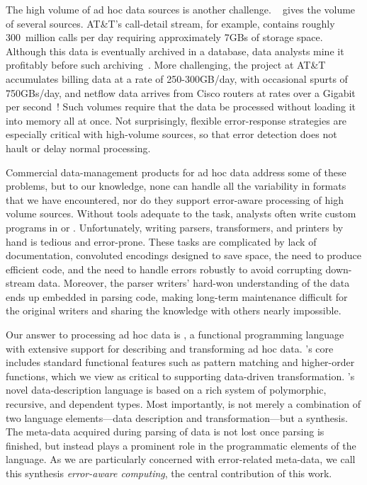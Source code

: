 The high volume of ad hoc data sources is another challenge.
~ gives the volume of several sources.
AT\&T's call-detail stream, for example, contains roughly 300~million
calls per day requiring approximately 7GBs of storage space.  Although
this data is eventually archived in a database, data analysts mine it
profitably before such archiving~\cite{kdd98,kdd99}.  More
challenging, the \ningaui{} project at AT\&T accumulates billing data
at a rate of 250-300GB/day, with occasional spurts of 750GBs/day, and
netflow data arrives from Cisco routers at rates over a Gigabit per
second~\cite{gigascope}!  Such volumes require that the data be
processed without loading it into memory all at once.  Not
surprisingly, flexible error-response strategies are especially
critical with high-volume sources, so that error detection does not
hault or delay normal processing.


Commercial data-management products for ad hoc data address 
some of these problems, but to our knowledge, none can handle all the variability
in formats that we have encountered, nor do they support error-aware
processing of high volume sources.  Without tools adequate to the
task, analysts often write custom programs in \C{} or \perl{}.
Unfortunately, writing parsers, transformers, and printers by hand is
tedious and error-prone.  These tasks are complicated by lack of
documentation, convoluted encodings designed to save space, the need
to produce efficient code, and the need to handle errors robustly to
avoid corrupting down-stream data.  Moreover, the parser writers'
hard-won understanding of the data ends up embedded in parsing code,
making long-term maintenance difficult for the original writers and
sharing the knowledge with others nearly impossible.


Our answer to processing ad hoc data is \datatype{}, a functional
programming language with extensive support for describing and
transforming ad hoc data.  \datatype{}'s core includes standard
functional features such as pattern matching and higher-order
functions, which we view as critical to supporting data-driven
transformation.  \datatype{}'s novel data-description language is
based on a rich system of polymorphic, recursive, and dependent types.
Most importantly, \datatype{} is not merely a combination of two
language elements---data description and transformation---but a
synthesis.  The meta-data acquired during parsing of data is not lost
once parsing is finished, but instead plays a prominent role in the
programmatic elements of the language.  As we are particularly
concerned with error-related meta-data, we call this synthesis
\emph{error-aware computing}, the central contribution of this work. 

